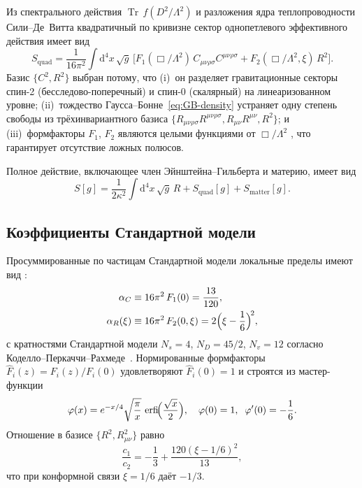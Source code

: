 \documentclass[12pt,a4paper]{article}
\newcommand{\Weylsq}{C_{\mu\nu\rho\sigma}C^{\mu\nu\rho\sigma}}
\newcommand{\Ricsq}{R_{\mu\nu}R^{\mu\nu}}
\newcommand{\Riemsq}{R_{\mu\nu\rho\sigma}R^{\mu\nu\rho\sigma}}
\newcommand{\dd}{\mathrm{d}}
\newcommand{\erfi}{\operatorname{erfi}}
\newcommand{\Tr}{\operatorname{Tr}}
\newcommand{\Lam}{\Lambda}
\theoremstyle{plain}
\theoremstyle{definition}
\begin{document}
Из спектрального действия $\Tr\,f(D^2/\Lam^2)$ и разложения ядра
теплопроводности Сили--Де~Витта квадратичный по кривизне сектор
однопетлевого эффективного действия имеет вид \cite{Alfyorov:2026ff}
\begin{equation}\label{eq:S-quad}
  S_{\mathrm{quad}} = \frac{1}{16\pi^2}\int\dd^4x\,\sqrt{g}\,
  \bigl[F_1(\Box/\Lam^2)\,\Weylsq
  + F_2(\Box/\Lam^2,\xi)\,R^2\bigr].
\end{equation}
Базис $\{C^2, R^2\}$ выбран потому, что (i)~он разделяет гравитационные
секторы спин-2 (бесследово-поперечный) и спин-0 (скалярный) на
линеаризованном уровне; (ii)~тождество Гаусса--Бонне~\eqref{eq:GB-density}
устраняет одну степень свободы из трёхинвариантного базиса
$\{\Riemsq, \Ricsq, R^2\}$; и (iii)~формфакторы $F_1$, $F_2$ являются
целыми функциями от $\Box/\Lam^2$ \cite{Alfyorov:2026ff}, что гарантирует отсутствие
ложных полюсов.

Полное действие, включающее член Эйнштейна--Гильберта и материю, имеет вид
\begin{equation}\label{eq:S-total}
  S[g] = \frac{1}{2\kappa^2}\int\dd^4x\,\sqrt{g}\,R
  + S_{\mathrm{quad}}[g] + S_{\mathrm{matter}}[g].
\end{equation}

\subsection{Коэффициенты Стандартной модели}

Просуммированные по частицам Стандартной модели локальные пределы имеют
вид \cite{Alfyorov:2026ff}:
\begin{align}
  \alpha_C &\equiv 16\pi^2\,F_1(0) = \frac{13}{120},
  \label{eq:alpha_C}\\
  \alpha_R(\xi) &\equiv 16\pi^2\,F_2(0,\xi)
  = 2\Bigl(\xi - \frac{1}{6}\Bigr)^{\!2},
  \label{eq:alpha_R}
\end{align}
с кратностями Стандартной модели $N_s = 4$,
$N_D = 45/2$, $N_v = 12$ согласно
Коделло--Перкаччи--Рахмеде~\cite{Codello:2008vh}.
Нормированные формфакторы $\hat{F}_i(z) = F_i(z)/F_i(0)$ удовлетворяют
$\hat{F}_i(0) = 1$ и строятся из мастер-функции
\begin{equation}\label{eq:master-phi}
  \varphi(x) = e^{-x/4}\sqrt{\frac{\pi}{x}}\,\erfi\!\Bigl(
  \frac{\sqrt{x}}{2}\Bigr),
  \quad \varphi(0) = 1,\;\; \varphi'(0) = -\frac{1}{6}.
\end{equation}
Отношение в базисе $\{R^2, R_{\mu\nu}^2\}$ равно
\begin{equation}\label{eq:c1c2-ratio}
  \frac{c_1}{c_2}
  = -\frac{1}{3} + \frac{120(\xi-1/6)^2}{13},
\end{equation}
что при конформной связи $\xi = 1/6$ даёт $-1/3$.
\end{document}
